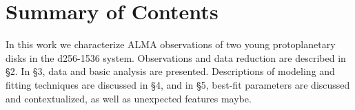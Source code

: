 









\section{Summary of Contents}

In this work we characterize ALMA observations of two young protoplanetary disks in the d256-1536 system. Observations and data reduction are described in \S2. In \S3, data and basic analysis are presented. Descriptions of modeling and fitting techniques are discussed in \S4, and in \S5, best-fit parameters are discussed and contextualized, as well as unexpected features maybe.






















